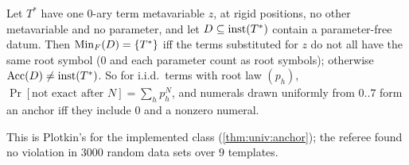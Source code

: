 \begin{proposition}\label{prop:exp:numerals}
Let $T^*$ have one $0$-ary term metavariable $z$, at rigid positions, no other metavariable and no parameter, and let $D\subseteq\mathrm{inst}(T^*)$ contain a parameter-free datum. Then $\mathrm{Min}_F(D)=\{T^*\}$ iff the terms substituted for $z$ do not all have the same root symbol ($0$ and each parameter count as root symbols); otherwise $\mathrm{Acc}(D)\neq\mathrm{inst}(T^*)$. So for i.i.d.\ terms with root law $(p_h)$, $\Pr[\text{not exact after }N]=\sum_hp_h^N$, and numerals drawn uniformly from $0..7$ form an anchor iff they include $0$ and a nonzero numeral.
\end{proposition}

This is Plotkin's \evR{} for the implemented class (\cref{thm:univ:anchor}); the referee found no violation in $3000$ random data sets over $9$ templates.

